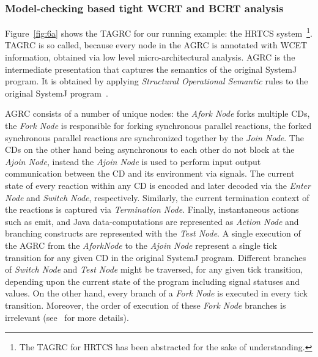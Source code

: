\subsubsection{Model-checking based tight WCRT and BCRT analysis}
\label{sec:model-checking-based}

Figure~\ref{fig:6a} shows the TAGRC for our running example: the HRTCS
system~\footnote{The TAGRC for HRTCS has been abstracted for the sake of
  understanding.}. TAGRC is so called, because every node in the AGRC is
annotated with WCET information, obtained via low level
micro-architectural analysis. AGRC is the intermediate presentation that
captures the semantics of the original SystemJ program. It is obtained
by applying \textit{Structural Operational Semantic} rules to the
original SystemJ program~\cite{amal10}.

AGRC consists of a number of unique nodes: the \textit{Afork Node} forks
multiple CDs, the \textit{Fork Node} is responsible for forking
synchronous parallel reactions, the forked synchronous parallel
reactions are synchronized together by the \textit{Join Node}. The CDs
on the other hand being asynchronous to each other do not block at the
\textit{Ajoin Node}, instead the \textit{Ajoin Node} is used to perform
input output communication between the CD and its environment via
signals. The current state of every reaction within any CD is encoded
and later decoded via the \textit{Enter Node} and \textit{Switch Node},
respectively. Similarly, the current termination context of the
reactions is captured via \textit{Termination Node}. Finally,
instantaneous actions such as emit, and Java data-computations are
represented as \textit{Action Node} and branching constructs are
represented with the \textit{Test Node}. A single execution of the AGRC
from the \textit{AforkNode} to the \textit{Ajoin Node} represent a
single tick transition for any given CD in the original SystemJ
program. Different branches of \textit{Switch Node} and \textit{Test
  Node} might be traversed, for any given tick transition, depending
upon the current state of the program including signal statuses and
values. On the other hand, every branch of a \textit{Fork Node} is
executed in every tick transition. Moreover, the order of execution of
these \textit{Fork Node} branches is irrelevant (see~\cite{amal10} for
more details).

